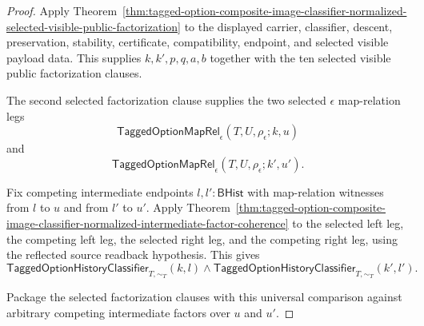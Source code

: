 \begin{proof}
Apply
Theorem~\ref{thm:tagged-option-composite-image-classifier-normalized-selected-visible-public-factorization}
to the displayed carrier, classifier, descent, preservation, stability,
certificate, compatibility, endpoint, and selected visible payload data. This
supplies $k,k',p,q,a,b$ together with the ten selected visible public
factorization clauses.

The second selected factorization clause supplies the two selected
$\epsilon$ map-relation legs
$$
\mathsf{TaggedOptionMapRel}_{\epsilon}(T,U,\rho_{\epsilon};k,u)
$$
and
$$
\mathsf{TaggedOptionMapRel}_{\epsilon}(T,U,\rho_{\epsilon};k',u').
$$

Fix competing intermediate endpoints $l,l':\mathsf{BHist}$ with map-relation
witnesses from $l$ to $u$ and from $l'$ to $u'$. Apply
Theorem~\ref{thm:tagged-option-composite-image-classifier-normalized-intermediate-factor-coherence}
to the selected left leg, the competing left leg, the selected right leg, and
the competing right leg, using the reflected source readback hypothesis. This
gives
$$
\mathsf{TaggedOptionHistoryClassifier}_{T,\sim_T}(k,l)\land
\mathsf{TaggedOptionHistoryClassifier}_{T,\sim_T}(k',l').
$$

Package the selected factorization clauses with this universal comparison
against arbitrary competing intermediate factors over $u$ and $u'$.
\end{proof}

